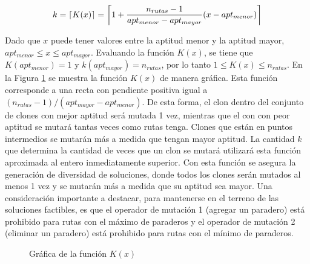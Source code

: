 \begin{equation}
\label{eq:vecesmut}
k = \ceil*{K(x)} = \ceil*{ 1 + \frac{n_{rutas} - 1}{apt_{menor} - apt_{mayor}} (x- apt_{menor})}
\end{equation}

Dado que $x$ puede tener valores entre la aptitud menor y la aptitud mayor, $apt_{menor} \leq x \leq apt_{mayor}$. Evaluando la función $K(x)$, se tiene que $K(apt_{menor})=1$ y $k(apt_{mayor})=n_{rutas}$, por lo tanto $1 \leq K(x) \leq n_{rutas}$. En la Figura \ref{fig:k(x)} se muestra la función $K(x)$ de manera gráfica. Esta función corresponde a una recta con pendiente positiva igual a $(n_{rutas}-1)/(apt_{mayor}-apt_{menor})$. De esta forma, el clon dentro del conjunto de clones con mejor aptitud será mutada 1 vez, mientras que el con con peor aptitud se mutará tantas veces como rutas tenga. Clones que están en puntos intermedios se mutarán más a medida que tengan mayor aptitud. La cantidad $k$ que determina la cantidad de veces que un clon se mutará utilizará esta función aproximada al entero inmediatamente superior. Con esta función se asegura la generación de diversidad de soluciones, donde todos los clones serán mutados al menos 1 vez y se mutarán más a medida que su aptitud sea mayor. Una consideración importante a destacar, para mantenerse en el terreno de las soluciones factibles, es que el operador de mutación 1 (agregar un paradero) está prohibido para rutas con el máximo de paraderos y el operador de mutación 2 (eliminar un paradero) está prohibido para rutas con el mínimo de paraderos.


\begin{figure}[!htb]
\begin{center}
\end{center}
\caption{Gráfica de la función $K(x)$}
\label{fig:k(x)}
\end{figure}

